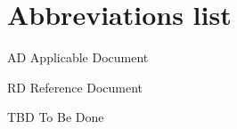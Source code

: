 \documentclass[../main.tex]{subfiles}
\begin{document}
\section*{Abbreviations list}
AD Applicable Document

RD Reference Document

TBD To Be Done
\end{document}
